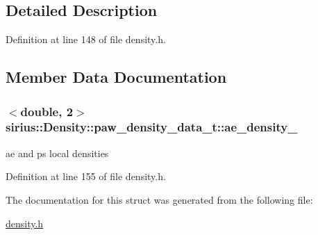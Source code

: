 \subsection{Detailed Description}


Definition at line 148 of file density.\+h.



\subsection{Member Data Documentation}
\hypertarget{structsirius_1_1_density_1_1paw__density__data__t_a647c03d527b97d38f5167f7180ed7438}{}
\subsubsection[{ae\+\_\+density\+\_\+}]{$<$double, 2$>$ sirius\+::\+Density\+::paw\+\_\+density\+\_\+data\+\_\+t\+::ae\+\_\+density\+\_\+}\label{structsirius_1_1_density_1_1paw__density__data__t_a647c03d527b97d38f5167f7180ed7438}


ae and ps local densities 



Definition at line 155 of file density.\+h.



The documentation for this struct was generated from the following file\+:\begin{DoxyCompactItemize}
\item 
\hyperlink{density_8h}{density.\+h}\end{DoxyCompactItemize}
